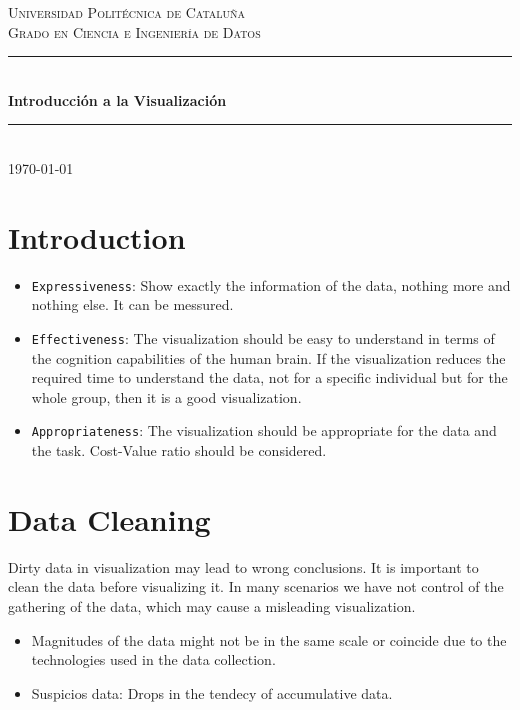 \documentclass{article}
\begin{document}
\begin{titlepage}
    \newcommand{\HRule}{\rule{\linewidth}{0.5mm}}
    
    \center %
    \textsc{\LARGE Universidad Politécnica de Cataluña}\\[1.5cm]
    \textsc{\Large Grado en Ciencia e Ingeniería de Datos}\\[0.5cm]
    \HRule\\[0.4cm]
    {\huge\bfseries Introducción a la Visualización}\\[0.4cm]
    \HRule\\[1.5cm]
    \vfill
    {\large\today}
\end{titlepage}

\newpage
\tableofcontents
\newpage

\fancyfoot{} %

\section{Introduction}

\begin{itemize}
  \item \texttt{Expressiveness}: Show exactly the information of the data, nothing more and nothing else. It can be messured.
  \item \texttt{Effectiveness}: The visualization should be easy to understand in terms of the cognition capabilities of the human brain.  If the visualization reduces the required time to understand the data, not for a specific individual but for the whole group, then it is a good visualization.
  \item \texttt{Appropriateness}: The visualization should be appropriate for the data and the task. Cost-Value ratio should be considered.
\end{itemize}

\section{Data Cleaning}
Dirty data in visualization may lead to wrong conclusions. It is important to clean the data before visualizing it. In many scenarios we have not control of the gathering of the data, which may cause a misleading visualization.
\begin{itemize}
  \item Magnitudes of the data might not be in the same scale or coincide due to the technologies used in the data collection.
  \item Suspicios data: Drops in the tendecy of accumulative data.
\end{itemize}
\end{document}

